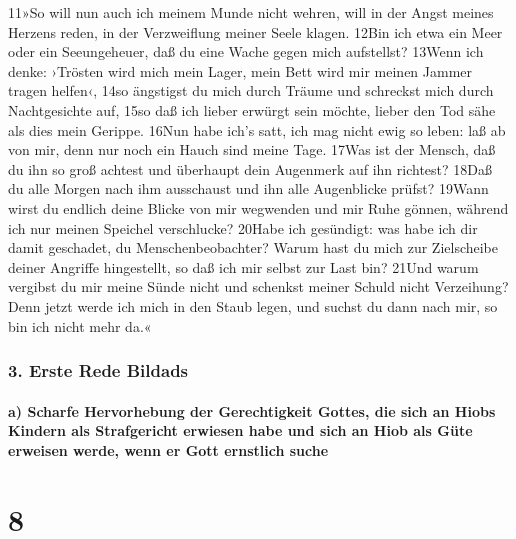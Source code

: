 11»So will nun auch ich meinem Munde nicht wehren, will in der Angst
meines Herzens reden, in der Verzweiflung meiner Seele klagen. 12Bin ich
etwa ein Meer oder ein Seeungeheuer, daß du eine Wache gegen mich
aufstellst? 13Wenn ich denke: ›Trösten wird mich mein Lager, mein Bett
wird mir meinen Jammer tragen helfen‹, 14so ängstigst du mich durch
Träume und schreckst mich durch Nachtgesichte auf, 15so daß ich lieber
erwürgt sein möchte, lieber den Tod sähe als dies mein Gerippe. 16Nun
habe ich's satt, ich mag nicht ewig so leben: laß ab von mir, denn nur
noch ein Hauch sind meine Tage. 17Was ist der Mensch, daß du ihn so groß
achtest und überhaupt dein Augenmerk auf ihn richtest? 18Daß du alle
Morgen nach ihm ausschaust und ihn alle Augenblicke prüfst? 19Wann wirst
du endlich deine Blicke von mir wegwenden und mir Ruhe gönnen, während
ich nur meinen Speichel verschlucke? 20Habe ich gesündigt: was habe ich
dir damit geschadet, du Menschenbeobachter? Warum hast du mich zur
Zielscheibe deiner Angriffe hingestellt, so daß ich mir selbst zur Last
bin? 21Und warum vergibst du mir meine Sünde nicht und schenkst meiner
Schuld nicht Verzeihung? Denn jetzt werde ich mich in den Staub legen,
und suchst du dann nach mir, so bin ich nicht mehr da.«

\hypertarget{erste-rede-bildads}{%
\subsubsection{3. Erste Rede Bildads}\label{erste-rede-bildads}}

\hypertarget{a-scharfe-hervorhebung-der-gerechtigkeit-gottes-die-sich-an-hiobs-kindern-als-strafgericht-erwiesen-habe-und-sich-an-hiob-als-guxfcte-erweisen-werde-wenn-er-gott-ernstlich-suche}{%
\paragraph{a) Scharfe Hervorhebung der Gerechtigkeit Gottes, die sich an
Hiobs Kindern als Strafgericht erwiesen habe und sich an Hiob als Güte
erweisen werde, wenn er Gott ernstlich
suche}\label{a-scharfe-hervorhebung-der-gerechtigkeit-gottes-die-sich-an-hiobs-kindern-als-strafgericht-erwiesen-habe-und-sich-an-hiob-als-guxfcte-erweisen-werde-wenn-er-gott-ernstlich-suche}}

\hypertarget{section-7}{%
\section{8}\label{section-7}}

